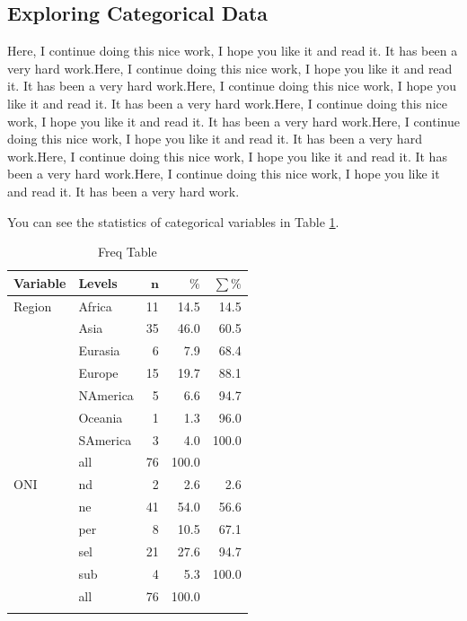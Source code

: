 \documentclass[11pt]{article}
\begin{document}




\subsection{Exploring Categorical Data}\label{catexplo}

Here, I continue doing this nice work, I hope you like it and read it. It has been a very hard work.Here, I continue doing this nice work, I hope you like it and read it. It has been a very hard work.Here, I continue doing this nice work, I hope you like it and read it. It has been a very hard work.Here, I continue doing this nice work, I hope you like it and read it. It has been a very hard work.Here, I continue doing this nice work, I hope you like it and read it. It has been a very hard work.Here, I continue doing this nice work, I hope you like it and read it. It has been a very hard work.Here, I continue doing this nice work, I hope you like it and read it. It has been a very hard work.

You can see the statistics of categorical variables in Table \ref{catexplore_table}.


\begingroup\normalsize
\begin{longtable}{llrrr}
\caption{Freq Table} \\ 
 \textbf{Variable} & \textbf{Levels} & $\mathbf{n}$ & $\mathbf{\%}$ & $\mathbf{\sum \%}$ \\ 
  \hline
Region & Africa & 11 & 14.5 & 14.5 \\ 
   & Asia & 35 & 46.0 & 60.5 \\ 
   & Eurasia & 6 & 7.9 & 68.4 \\ 
   & Europe & 15 & 19.7 & 88.1 \\ 
   & NAmerica & 5 & 6.6 & 94.7 \\ 
   & Oceania & 1 & 1.3 & 96.0 \\ 
   & SAmerica & 3 & 4.0 & 100.0 \\ 
   \hline
 & all & 76 & 100.0 &  \\ 
   \hline
\hline
ONI & nd & 2 & 2.6 & 2.6 \\ 
   & ne & 41 & 54.0 & 56.6 \\ 
   & per & 8 & 10.5 & 67.1 \\ 
   & sel & 21 & 27.6 & 94.7 \\ 
   & sub & 4 & 5.3 & 100.0 \\ 
   \hline
 & all & 76 & 100.0 &  \\ 
   \hline
\hline
\hline
\label{catexplore_table}
\end{longtable}
\endgroup
\end{document}
